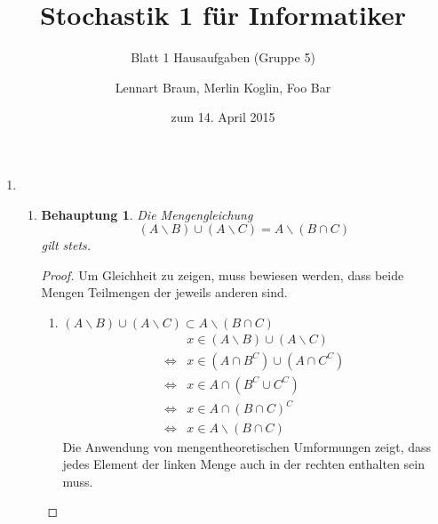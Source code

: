\documentclass[a4paper]{scrartcl}
\title{Stochastik 1 für Informatiker}
\subtitle{Blatt 1 Hausaufgaben (Gruppe 5)}
\author{
	Lennart Braun,
    Merlin Koglin,
    Foo Bar
}
\date{zum 14. April 2015}
\newtheorem*{behaupt}{Behauptung}
\newcommand{\gdw}{\Leftrightarrow}
\begin{document}
\maketitle

\begin{enumerate}[label=\bfseries\arabic*.]
    \item
        \begin{enumerate}[label=(\alph*)]
            \item
                \begin{behaupt}
                    Die Mengengleichung
                    \begin{equation}
                        (A \backslash B) \cup (A \backslash C)
                        = A \backslash (B \cap C)
                    \end{equation}
                    gilt stets.
                \end{behaupt}
                \begin{proof}
                    Um Gleichheit zu zeigen, muss bewiesen werden, dass beide
                    Mengen Teilmengen der jeweils anderen sind.
                    \begin{enumerate}
                        \item
                            $(A \backslash B) \cup (A \backslash C)
                            \subset A \backslash (B \cap C)$ \\
                            \begin{equation}
                                \begin{split}
                                         &x \in (A \backslash B)
                                            \cup (A \backslash C) \\
                                    \gdw &x \in (A \cap B^C) \cup (A \cap C^C) \\
                                    \gdw &x \in A \cap (B^C \cup C^C) \\
                                    \gdw &x \in A \cap (B \cap C)^C \\
                                    \gdw &x \in A \backslash (B \cap C)
                                \end{split}
                            \end{equation}
                            Die Anwendung von mengentheoretischen Umformungen
                            zeigt, dass jedes Element der linken Menge auch in
                            der rechten enthalten sein muss.


\end{enumerate}
\end{proof}
\end{enumerate}
\end{enumerate}
\end{document}
